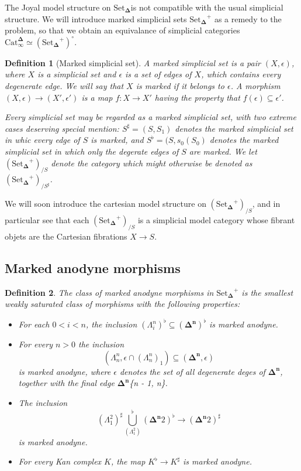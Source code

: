 \documentclass[12pt]{amsart}
\newcommand{\8}{\ensuremath{\infty}}
\newcommand{\Horn}[2]{\ensuremath{\Lambda^{#1}_{#2}}}
\newcommand{\Simplex}[1][n]{\ensuremath{\boldsymbol{\Delta^{#1}}}}
\newcommand{\SSet}{\ensuremath{\text{Set}_{\boldsymbol{\Delta}}}}
\newcommand{\Catinfdel}{\ensuremath{\text{Cat}^{\boldsymbol{\Delta}}_{\infty}}}
\newtheorem{definition}{Definition}
\begin{document}
The Joyal model structure on \SSet is not compatible with the usual simplicial structure. We will introduce marked simplicial sets $\SSet^+$ as a remedy to the problem, so that we obtain an equivalance of simplicial categories $\Catinfdel \simeq (\SSet^+)^\circ$.

\begin{definition}[Marked simplicial set]
  A marked simplicial set is a pair $(X, \epsilon)$, where $X$ is a simplicial set and $\epsilon$ is a set of edges of $X$, which contains every degenerate edge. We will say that $X$ is marked if it belongs to $\epsilon$. A morphism $(X, \epsilon) \rightarrow (X', \epsilon')$ is a map $f : X \rightarrow X'$ having the property that $f(\epsilon) \subseteq \epsilon'$.

  Every simplicial set may be regarded as a marked simplicial set, with two extreme cases deserving special mention: $S^\sharp = (S, S_1)$ denotes the marked simplicial set in whic every edge of $S$ is marked, and $S^\flat = (S, s_0(S_0)$ denotes the marked simplicial set in which only the degerate edges of $S$ are marked. We let $(\SSet^+)_{/S}$ denote the category which might otherwise be denoted as $(\SSet^+)_{/S^\sharp}$.
\end{definition}

We will soon introduce the cartesian model structure on $(\SSet^+)_{/S}$, and in particular see that each $(\SSet^+)_{/S}$ is a simplicial model category whose fibrant objets are the Cartesian fibrations $X \rightarrow S$.

\subsection{Marked anodyne morphisms}

\begin{definition}
  The class of marked anodyne morphisms in $\SSet^+$ is the smallest weakly saturated class of morphisms with the following properties:

  \begin{itemize}
    \item For each $0 < i < n$, the inclusion $(\Horn{n}{i})^\flat \subseteq (\Simplex)^\flat$ is marked anodyne.
    \item For every $n > 0$ the inclusion
          $$
            (\Horn{n}{n}, \epsilon \cap (\Horn{n}{n})_1) \subseteq (\Simplex, \epsilon)
          $$
          is marked anodyne, where $\epsilon$ denotes the set of all degenerate deges of \Simplex, together with the final edge \Simplex{\{n - 1, n\}}.
    \item The inclusion
          $$
            (\Horn{2}{1})^\sharp \bigcup_(\Horn{2}{1})^\flat (\Simplex{2})^\flat \rightarrow (\Simplex{2})^\sharp
          $$
          is marked anodyne.
    \item For every Kan complex $K$, the map $K^\flat \rightarrow K^\sharp$ is marked anodyne.
  \end{itemize}
\end{definition}
\end{document}
